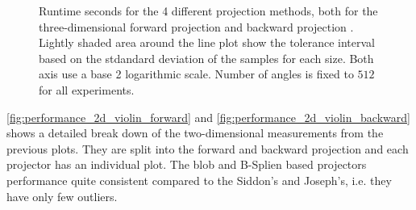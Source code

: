 \begin{figure}[h]
	\centering


	\caption{Runtime seconds for the 4 different projection methods, both for the
		three-dimensional forward projection 
		and backward projection . Lightly
		shaded area around the line plot show the tolerance interval based on the stdandard
		deviation of the samples for each size. Both axis use a base 2 logarithmic scale.
		Number of angles is fixed to \(512\) for all experiments.}%
	\label{fig:performance_3d_lineplot}
\end{figure}

\autoref{fig:performance_2d_violin_forward} and \autoref{fig:performance_2d_violin_backward}
shows a detailed break down of the two-dimensional measurements from the previous plots. They are
split into the forward and backward projection and each projector has an individual plot. The blob
and B-Splien based projectors performance quite consistent compared to the Siddon's and Joseph's,
i.e. they have only few outliers.


